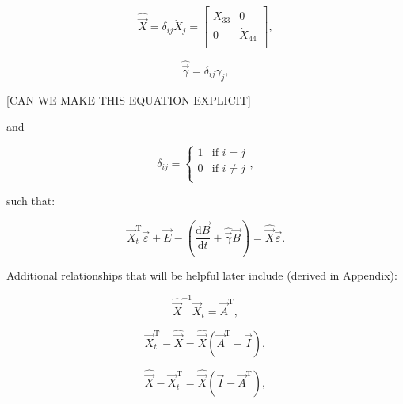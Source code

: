 \begin{equation} \label{eq:X_hat_matrix_def}
	\hat{\vec{X}} = \delta_{ij}\dot{X}_{j} = \begin{bmatrix} 	\dot{X}_{33}		&	0					\\
																								0					&	\dot{X}_{44}	\\
																							\end{bmatrix},
\end{equation}

\begin{equation} \label{eq:B_hat_matrix_def}
	\hat{\vec{\gamma}} = \delta_{ij}\gamma_{j},
\end{equation}

[CAN WE MAKE THIS EQUATION EXPLICIT]

\noindent and

\begin{equation}\label{eq:k_delta}
	\delta_{ij} = \begin{cases}	1 	& 	\text{if  } i = j		\\
												0	&	\text{if  } i \neq j	\\
						\end{cases},
\end{equation}

\noindent{}such that:

\begin{equation} \label{eq:matrix_leontief}
	\vec{X}_{t}^{\mathrm{T}}\vec{\varepsilon} + \vec{E} - \left(\frac{\mathrm{d}\vec{B}}{\mathrm{d}t} + \hat{\vec{\gamma}}\vec{B}\right) = \hat{\vec{X}}\vec{\varepsilon}.
\end{equation}

Additional relationships that will be helpful later include (derived in Appendix):

\begin{equation} \label{eq:Xhat_X_and_A}
	\hat{\vec{X}}^{-1}\vec{X}_{t} = \vec{A}^{\mathrm{T}},
\end{equation}

\begin{equation} \label{eq:Xdifference1}
	\vec{X}_{t}^{\mathrm{T}} - \hat{\vec{X}} = \hat{\vec{X}}(\vec{A}^{\mathrm{T}} - \vec{I}),
\end{equation}

\begin{equation} \label{eq:Xdifference2}
	\hat{\vec{X}} - \vec{X}_{t}^{\mathrm{T}} = \hat{\vec{X}}(\vec{I} - \vec{A}^{\mathrm{T}}),
\end{equation}

